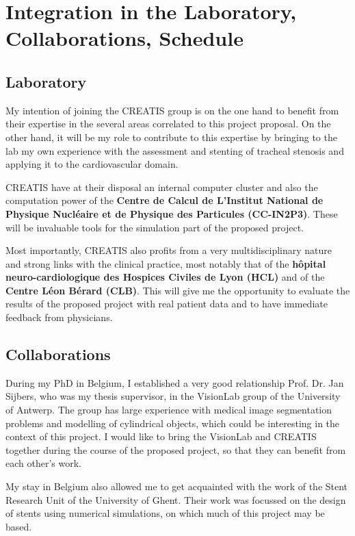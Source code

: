 \documentclass[a4paper]{article}
\begin{document}
\citep{deBeule}

\section{Integration in the Laboratory, Collaborations, Schedule}

\subsection{Laboratory}

My intention of joining the CREATIS group is on the one hand to benefit from their expertise in the several areas correlated to this project proposal. On the other hand, it will be my role to contribute to this expertise by bringing to the lab my own experience with the assessment and stenting of tracheal stenosis and applying it to the cardiovascular domain.

CREATIS have at their disposal an internal computer cluster and also the computation power of the {\bf Centre de Calcul de L'Institut National de Physique Nucl\'eaire et de Physique des Particules (CC-IN2P3)}. These will be invaluable tools for the simulation part of the proposed project. 

Most importantly, CREATIS also profits from a very multidisciplinary nature and strong links with the clinical practice, most notably that of the {\bf h\^opital neuro-cardiologique des Hospices Civiles de Lyon (HCL)} and of the {\bf Centre L\'eon B\'erard (CLB)}. This will give me the opportunity to evaluate the results of the proposed project with real patient data and to have immediate feedback from physicians. 

\subsection{Collaborations}

During my PhD in Belgium, I established a very good relationship Prof. Dr. Jan Sijbers, who was my thesis supervisor, in the VisionLab group of the University of Antwerp. The group has large experience with medical image segmentation problems and modelling of cylindrical objects, which could be interesting in the context of this project. I would like to bring the VisionLab and CREATIS together during the course of the proposed project, so that they can benefit from each other's work.

My stay in Belgium also allowed me to get acquainted with the work of the Stent Research Unit of the University of Ghent. Their work was focussed on the design of stents using numerical simulations, on which much of this project may be based. 
\end{document}
